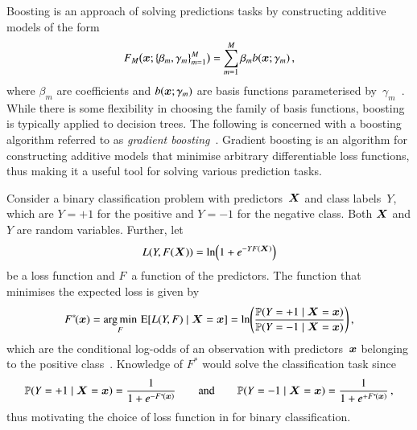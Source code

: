 Boosting is an approach of solving predictions tasks by constructing additive
models of the form
\begin{align*}
  F_{M}\bigl(\bm{x}; \{ \beta_m, \gamma_{m} \}_{m=1}^{M} \bigr) = \sum_{m = 1}^{M} \beta_m b(\bm{x}; \gamma_{m}) \,\text{,}
\end{align*}
where $\beta_m$ are coefficients and $b(\bm{x}; \gamma_{m})$ are basis
functions parameterised
by~$\gamma_{m}$~\cite{Friedman:2000,Friedman:2001wbq}. While there is some
flexibility in choosing the family of basis functions, boosting is typically
applied to decision trees.
The following is concerned with a boosting algorithm referred to as
\emph{gradient boosting}~\cite{Friedman:2001wbq}. Gradient boosting is an
algorithm for constructing additive models that minimise arbitrary
differentiable loss functions, thus making it a useful tool for solving various
prediction tasks.

Consider a binary classification problem with predictors~$\bm{X}$ and class
labels~$Y$, which are $Y = +1$ for the positive and $Y = -1$ for the negative
class. Both $\bm{X}$ and $Y$ are random variables. Further, let
\begin{align}
  L(Y, F(\bm{X})) = \ln\mathopen{}\left(
  1 + e^{-Y F(\bm{X})}
  \right)\mathclose{}
  \label{eq:loss_gradboost}
\end{align}
be a loss function and $F$~a function of the predictors. The function that
minimises the expected loss is given by
\begin{align*}
  F^{*\!}(\bm{x})
  = \operatorname*{arg\,min}_F \, \operatorname{E}[ L(Y, F) \mid \bm{X} = \bm{x} ]
  = \ln\mathopen{}\left(
  \frac{
  \mathbb{P}(Y = +1 \mid \bm{X} = \bm{x})
  }{
  \mathbb{P}(Y = -1 \mid \bm{X} = \bm{x})
  }
  \right)\mathclose{} \,\text{,}
\end{align*}
which are the conditional log-odds of an observation with predictors~$\bm{x}$
belonging to the positive class~\cite{Friedman:2000}. Knowledge of $F^{*\!}$
would solve the classification task since
\begin{align}
  \mathbb{P}(Y = +1 \mid \bm{X} = \bm{x}) = \frac{1}{1 + e^{-F^{*\!}(\bm{x})}}
  \qquad \text{and} \qquad
  \mathbb{P}(Y = -1 \mid \bm{X} = \bm{x}) = \frac{1}{1 + e^{+F^{*\!}(\bm{x})}} \,\text{,}
  \label{eq:gradboost_probas}
\end{align}
thus motivating the choice of loss function in  for
binary classification.

